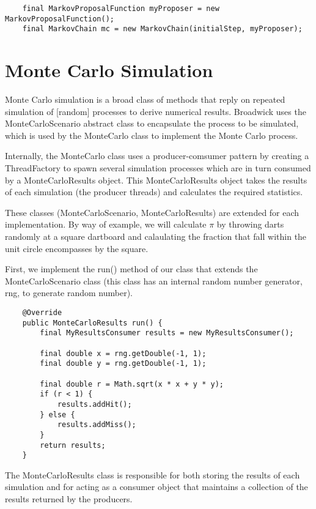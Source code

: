 \begin{lstlisting}
    final MarkovProposalFunction myProposer = new MarkovProposalFunction();
    final MarkovChain mc = new MarkovChain(initialStep, myProposer);
\end{lstlisting}


\section{Monte Carlo Simulation}
Monte Carlo simulation is a broad class of methods that reply on repeated simulation of [random] processes to derive numerical results. Broadwick uses the MonteCarloScenario abstract class to encapsulate the process to be simulated, which is used by the MonteCarlo class to implement the Monte Carlo process.

Internally, the MonteCarlo class uses a producer-comsumer pattern by creating a ThreadFactory to spawn several simulation processes which are in turn consumed by a MonteCarloResults object. This MonteCarloResults object takes the results of each simulation (the producer threads) and calculates the required statistics.

These classes (MonteCarloScenario, MonteCarloResults) are extended for each implementation. By way of example, we will calculate $\pi$ by throwing darts randomly at a square dartboard and calaulating the fraction that fall within the unit circle encompasses by the square.

First, we implement the run() method of our class that extends the MonteCarloScenario class (this class has an internal random number generator, rng, to generate random number).
\begin{lstlisting}
    @Override
    public MonteCarloResults run() {
        final MyResultsConsumer results = new MyResultsConsumer();

        final double x = rng.getDouble(-1, 1);
        final double y = rng.getDouble(-1, 1);

        final double r = Math.sqrt(x * x + y * y);
        if (r < 1) {
            results.addHit();
        } else {
            results.addMiss();
        }
        return results;
    }
\end{lstlisting}

The MonteCarloResults class is responsible for both storing the results of each simulation and for acting as a consumer
object that maintains a collection of the results returned by the producers.

